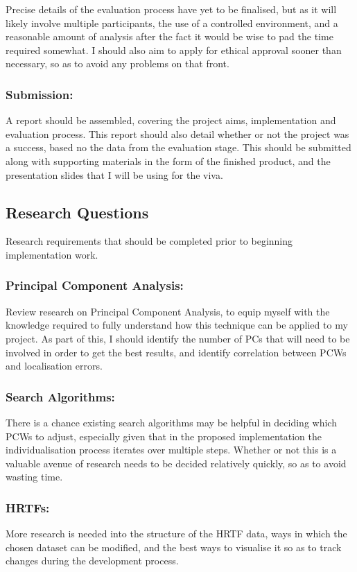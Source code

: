 \documentclass[10pt, oneside, a4paper, draft]{scrartcl}
\begin{document}
Precise details of the evaluation process have yet to be finalised, but as it will likely involve multiple participants, the use of a controlled environment, and a reasonable amount of analysis after the fact it would be wise to pad the time required somewhat. I should also aim to apply for ethical approval sooner than necessary, so as to avoid any problems on that front. 

\subsubsection*{Submission:}

A report should be assembled, covering the project aims, implementation and evaluation process. This report should also detail whether or not the project was a success, based no the data from the evaluation stage. This should be submitted along with supporting materials in the form of the finished product, and the presentation slides that I will be using for the viva. 

\subsection*{Research Questions} %

Research requirements that should be completed prior to beginning implementation work. 

\subsubsection*{Principal Component Analysis:}

Review research on Principal Component Analysis, to equip myself with the knowledge required to fully understand how this technique can be applied to my project. As part of this, I should identify the number of PCs that will need to be involved in order to get the best results, and identify correlation between PCWs and localisation errors. 

\subsubsection*{Search Algorithms:} 

There is a chance existing search algorithms may be helpful in deciding which PCWs to adjust, especially given that in the proposed implementation the individualisation process iterates over multiple steps. Whether or not this is a valuable avenue of research needs to be decided relatively quickly, so as to avoid wasting time. 

\subsubsection*{HRTFs:}

More research is needed into the structure of the HRTF data, ways in which the chosen dataset can be modified, and the best ways to visualise it so as to track changes during the development process.

\section*{} 


\end{document}
